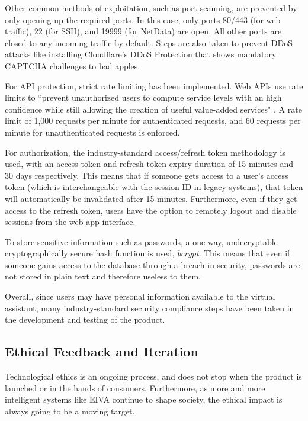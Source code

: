 \documentclass{article}
\begin{document}
Other common methods of exploitation, such as port scanning, are prevented by only opening up the required ports. In this case, only ports 80/443 (for web traffic), 22 (for SSH), and 19999 (for NetData) are open. All other ports are closed to any incoming traffic by default. Steps are also taken to prevent DDoS attacks like installing Cloudflare's DDoS Protection that shows mandatory CAPTCHA challenges to bad apples.

For API protection, strict rate limiting has been implemented. Web APIs use rate limits to ``prevent unauthorized users to compute service levels with an high confidence while still allowing the creation of useful value-added services" \cite{firmani_computing_2019}. A rate limit of 1,000 requests per minute for authenticated requests, and 60 requests per minute for unauthenticated requests is enforced.

For authorization, the industry-standard access/refresh token methodology is used, with an access token and refresh token expiry duration of 15 minutes and 30 days respectively. This means that if someone gets access to a user's access token (which is interchangeable with the session ID in legacy systems), that token will automatically be invalidated after 15 minutes. Furthermore, even if they get access to the refresh token, users have the option to remotely logout and disable sessions from the web app interface.

To store sensitive information such as passwords, a one-way, undecryptable cryptographically secure hash function is used, \emph{bcrypt}. This means that even if someone gains access to the database through a breach in security, passwords are not stored in plain text and therefore useless to them.

Overall, since users may have personal information available to the virtual assistant, many industry-standard security compliance steps have been taken in the development and testing of the product.

\subsection{Ethical Feedback and Iteration}

Technological ethics is an ongoing process, and does not stop when the product is launched or in the hands of consumers. Furthermore, as more and more intelligent systems like EIVA continue to shape society, the ethical impact is always going to be a moving target.
\end{document}
